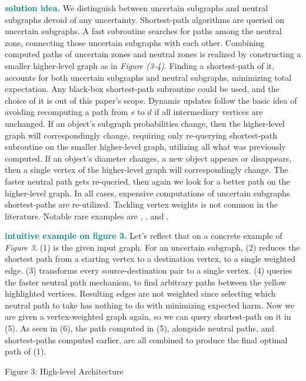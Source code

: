 \textcolor{teal}{\textbf{solution idea.}} We distinguish between uncertain subgraphs and neutral subgraphs devoid of any uncertainty. Shortest-path algorithms are queried on uncertain subgraphs. A fast subroutine searches for paths among the neutral zone, connecting those uncertain subgraphs with each other. Combining computed paths of uncertain zones and neutral zones is realized by constructing a smaller higher-level graph as in \textit{Figure (3-4)}. Finding a shortest-path of it, accounts for both uncertain subgraphs and neutral subgraphs, minimizing total expectation. Any black-box shortest-path subroutine could be used, and the choice of it is out of this paper's scope. Dynamic updates follow the basic idea of avoiding recomputing a path from $s$ to $d$ if all intermediary vertices are unchanged. If an object's subgraph probabilities change, then the higher-level graph will correspondingly change, requiring only re-querying shortest-path subroutine on the smaller higher-level graph, utilizing all what was previously computed. If an object's diameter changes, a new object appears or disappears, then a single vertex of the higher-level graph will correspondingly change. The faster neutral path gets re-queried, then again we look for a better path on the higher-level graph. In all cases, expensive computations of uncertain subgraphs shortest-paths are re-utilized. Tackling vertex weights is not common in the literature. Notable rare examples are \cite{vertexWeighted_1}, \cite{vertexWeighted_2}, and \cite{vertexWeighted_3}.

\textcolor{teal}{\textbf{intuitive example on figure 3.}} Let's reflect that on a concrete example of \textit{Figure 3}. (1) is the given input graph. For an uncertain subgraph, (2) reduces the shortest path from a starting vertex to a destination vertex, to a single weighted edge. (3) transforms every source-destination pair to a single vertex. (4) queries the faster neutral path mechanism, to find arbitrary paths between the yellow highlighted vertices. Resulting edges are not weighted since selecting which neutral path to take has nothing to do with minimizing expected harm. Now we are given a vertex-weighted graph again, so we can query shortest-path on it in (5). As seen in (6), the path computed in (5), alongside neutral paths, and shortest-paths computed earlier, are all combined to produce the final optimal path of (1).


\begin{center}
    Figure 3: High-level Architecture
\end{center}

